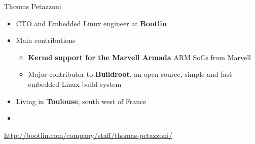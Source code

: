\begin{frame}{Thomas Petazzoni}
  \begin{itemize}
  \item CTO and Embedded Linux engineer at {\bf Bootlin}
  \item Main contributions
    \begin{itemize}
    \item {\bf Kernel support for the Marvell Armada} ARM SoCs from
      Marvell
    \item Major contributor to {\bf Buildroot}, an open-source, simple and
      fast embedded Linux build system
    \end{itemize}
  \item Living in {\bf Toulouse}, south west of France
  \item {}
  \end{itemize}
  {\small \url{http://bootlin.com/company/staff/thomas-petazzoni/}}
\end{frame}

